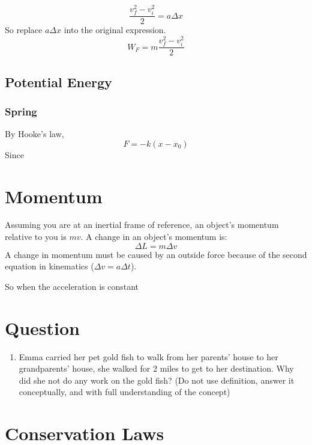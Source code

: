 \documentclass[]{article}
\begin{document}
	$$\frac{v_f^2 - v^2_i}{2} = a\Delta x$$
	So replace $a\Delta x$ into the original expression.
	$$W_F = m \frac{v_f^2 - v^2_i}{2}$$
	
	\subsection{Potential Energy}
		\subsubsection{Spring}
			By Hooke's law, 
			$$F = -k (x-x_0)$$
			Since 	
\section{Momentum}
Assuming you are at an inertial frame of reference, an object's momentum relative to you is $mv$. A change in an object's momentum is:
$$\Delta L = m \Delta v$$
A change in momentum must be caused by an outside force because of the second equation in kinematics ($\Delta v = a\Delta t$).

So when the acceleration is constant
\section{Question}
\begin{enumerate}
	\item Emma carried her pet gold fish to walk from her parents' house to her grandparents' house, she walked for 2 miles to get to her destination. Why did she not do any work on the gold fish? (Do not use definition, answer it conceptually, and with full understanding of the concept)
\end{enumerate}
\section{Conservation Laws}
\end{document}
